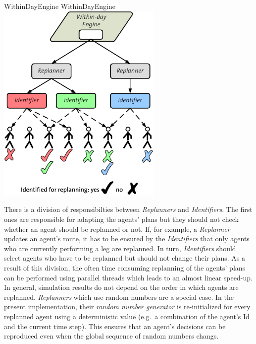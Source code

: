 \createfigure%
{WithinDayEngine}%
{WithinDayEngine}%
{\label{fig:labelWithinDayEngine}}%
{\includegraphics[width=8.0cm, angle=0]{extending/figures/WithinDayReplanning/ReplanningManager}}%
{}


There is a division of responsibilties between \emph{Replanners} and \emph{Identifiers}. The first ones are responsible for adapting the agents' plans but they should not check whether an agent should be replanned or not. If, for example, a \emph{Replanner} updates an agent's route, it has to be ensured by the \emph{Identifiers} that only agents who are currently performing a leg are replanned. In turn, \emph{Identifiers} should select agents who have to be replanned but should not change their plans. As a result of this division, the often time consuming replanning of the agents' plans can be performed using parallel threads which leads to an almost linear speed-up. In general, simulation results do not depend on the order in which agents are replanned. \emph{Replanners} which use random numbers are a special case. 
In the present implementation, their \emph{random number generator} is re-initialized for every replanned agent using a deterministic value (e.g.~a combination of the agent's Id and the current time step).  This ensures that an agent's decisions can be reproduced even when the global sequence of random numbers changs. 

